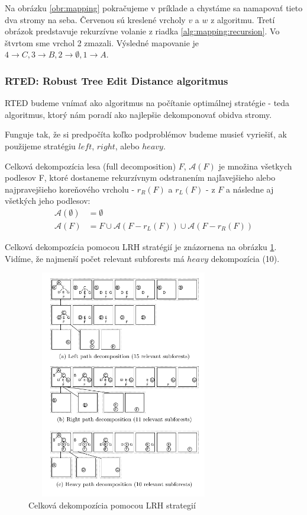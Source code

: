 Na obrázku \ref{obr:mapping} pokračujeme v príklade a chystáme sa namapovať tieto
dva stromy na seba. Červenou sú kreslené vrcholy $v$ a $w$ z algoritmu.
Tretí obrázok predstavuje rekurzívne volanie z riadka \ref{alg:mapping:recursion}.
Vo štvrtom sme vrchol 2 zmazali.
Výsledné mapovanie je $4 \to C, 3 \to B, 2 \to \emptyset, 1 \to A$.





\subsubsection{RTED: Robust Tree Edit Distance algoritmus}

RTED budeme vnímať ako algoritmus na počítanie optimálnej stratégie - teda algoritmus,
ktorý nám poradí ako najlepšie dekomponovať obidva stromy.

Funguje tak, že si predpočíta koľko podproblémov budeme musieť vyriešiť, ak použijeme stratégiu
$left$, $right$, alebo $heavy$.

\begin{definice}
	Celková dekompozícia lesa (full decomposition) $F$, $\mathcal{A}(F)$ je množina
	všetkych podlesov F, ktoré dostaneme rekurzívnym odstranením najľavejšieho
	alebo najpravejšieho koreňového vrcholu - $r_{R}(F)$ a $r_{L}(F)$ - z $F$
	a následne aj všetkých jeho podlesov:
	\begin{align*}
		\mathcal{A}(\emptyset) &= \emptyset
		\\
		\mathcal{A}(F) &= {F} \cup \mathcal{A}(F - r_{L}(F)) \cup \mathcal{A}(F - r_{R}(F))
	\end{align*}
\end{definice}

Celková dekompozícia pomocou LRH stratégií je znázornena na obrázku \ref{obr:LRH_decomposition}.
Vidíme, že najmenší počet relevant subforests má $heavy$ dekompozícia (10).

\begin{figure}
\centering
\includegraphics[width=85mm, height=100mm]{../img/LRH_decomposition.png}
\caption{Celková dekompozícia pomocou LRH strategií }
\label{obr:LRH_decomposition}
\end{figure}


